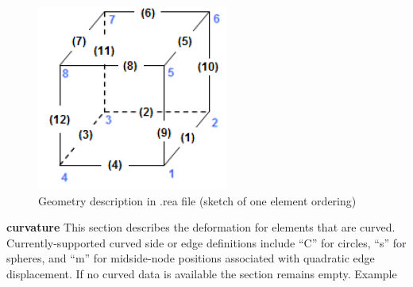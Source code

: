 \begin{description}
\begin{table}
\caption{Geometry description in .rea file}
\end{table}
\normalsize

\begin{figure}
\includegraphics[scale=0.5]{Figs/3dcube}
\caption{Geometry description in .rea file (sketch of one element ordering)}
\end{figure}

\item{\bf curvature} 
     This section describes the deformation for elements that are curved.
     Currently-supported curved side or edge definitions include ``C''
     for circles, ``s'' for spheres, and ``m'' for midside-node positions
     associated with quadratic edge displacement. If no curved data is available the section remains empty.
     Example
     

\end{description}
